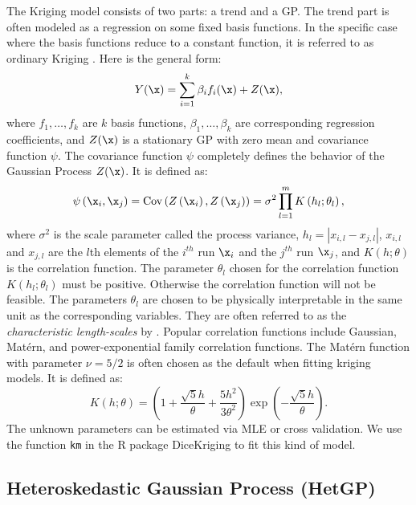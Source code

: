 \documentclass [PhD] {package/uclathes}
\begin{document}
The Kriging model consists of two parts: a trend and a GP. The trend part is often modeled as a regression on some fixed basis functions. In the specific case where the basis functions reduce to a constant function, it is referred to as ordinary Kriging  \parencite{roustant2012dicekriging}. Here is the general form:
\begin{equation}\label{eq:UK}
      Y(\x) = \sum_{i=1}^k \beta_i f_i(\x) + Z(\x),
\end{equation}
where $f_1, \ldots, f_k$ are $k$ basis functions, $\beta_1, \dots,\beta_k$ are corresponding regression coefficients, and  \(Z(\x)\) is a stationary GP with zero mean and covariance function \(\psi\). %
The covariance function $\psi$ completely defines the behavior of the Gaussian Process $Z(\x)$. It is defined as:
\begin{equation}
\psi\left(\x_{i},\x_{j}\right) =\operatorname{Cov} \left(Z\left(\x_{i}\right), Z\left(\x_{j}\right)\right) = \sigma^{2} \prod_{l=1}^{m} K\left(h_{l} ; \theta_{l}\right),
\end{equation}
where $\sigma^2$ is the scale parameter called the process variance,
$h_l = |x_{i,l}-x_{j,l}|$, $x_{i,l}$ and $x_{j,l}$ are the $l$th elements of the $i^{th}$ run $\x_i$ and the $j^{th}$ run $\x_j$, and $K(h ; \theta)$ is the correlation function.
The parameter $\theta_l$ chosen for the correlation function $K\left(h_{l};\theta_{l}\right)$  must be positive. Otherwise the correlation function will not be feasible.  The parameters $\theta_l$ are chosen to be physically interpretable in the same unit as the corresponding variables. They are often referred to as the  \textit{characteristic length-scales} by \textcite{rasmussen2006gaussian}. Popular correlation functions include Gaussian, Mat\'ern, and power-exponential family correlation functions. The Mat\'ern function with parameter $\nu = 5/2$ is often chosen as the default   when fitting kriging models. It is defined as:
\begin{equation}
K(h ; \theta)=\left(1+\frac{\sqrt{5} h}{\theta}+\frac{5 h^{2}}{3 \theta^{2}}\right) \exp \left(-\frac{\sqrt{5} h}{\theta}\right).
\end{equation}
The unknown parameters can be estimated via MLE or cross validation.
We use the function \texttt{km} in the R package DiceKriging to fit this kind of model.


\subsection*{{Heteroskedastic Gaussian Process (HetGP)}}
\end{document}

